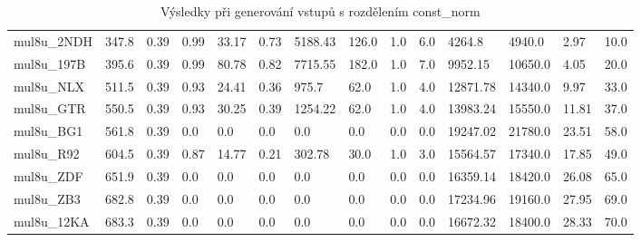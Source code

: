 \begin{landscape}
\begin{table}[!ht]
{\begin{tabular}{|l|l|l|l|l|l|l|l|l|l|l|l|l|l|}
        mul8u\_2NDH & 347.8 & 0.39 & 0.99 & 33.17 & 0.73 & 5188.43 & 126.0 & 1.0 & 6.0 & 4264.8 & 4940.0 & 2.97 & 10.0 \\ 
        mul8u\_197B & 395.6 & 0.39 & 0.99 & 80.78 & 0.82 & 7715.55 & 182.0 & 1.0 & 7.0 & 9952.15 & 10650.0 & 4.05 & 20.0 \\ 
        mul8u\_NLX & 511.5 & 0.39 & 0.93 & 24.41 & 0.36 & 975.7 & 62.0 & 1.0 & 4.0 & 12871.78 & 14340.0 & 9.97 & 33.0 \\ 
        mul8u\_GTR & 550.5 & 0.39 & 0.93 & 30.25 & 0.39 & 1254.22 & 62.0 & 1.0 & 4.0 & 13983.24 & 15550.0 & 11.81 & 37.0 \\ 
        mul8u\_BG1 & 561.8 & 0.39 & 0.0 & 0.0 & 0.0 & 0.0 & 0.0 & 0.0 & 0.0 & 19247.02 & 21780.0 & 23.51 & 58.0 \\ 
        mul8u\_R92 & 604.5 & 0.39 & 0.87 & 14.77 & 0.21 & 302.78 & 30.0 & 1.0 & 3.0 & 15564.57 & 17340.0 & 17.85 & 49.0 \\ 
        mul8u\_ZDF & 651.9 & 0.39 & 0.0 & 0.0 & 0.0 & 0.0 & 0.0 & 0.0 & 0.0 & 16359.14 & 18420.0 & 26.08 & 65.0 \\ 
        mul8u\_ZB3 & 682.8 & 0.39 & 0.0 & 0.0 & 0.0 & 0.0 & 0.0 & 0.0 & 0.0 & 17234.96 & 19160.0 & 27.95 & 69.0 \\ 
        mul8u\_12KA & 683.3 & 0.39 & 0.0 & 0.0 & 0.0 & 0.0 & 0.0 & 0.0 & 0.0 & 16672.32 & 18400.0 & 28.33 & 70.0 \\ 
    \end{tabular}}
    \caption{Výsledky při generování vstupů s rozdělením const\_norm}
    \label{const_norm}
\end{table}


\end{landscape}
